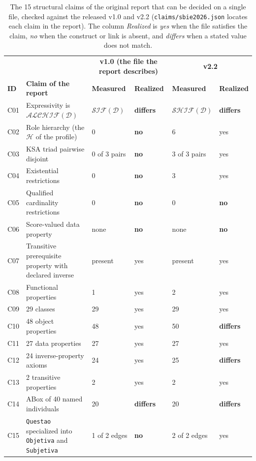 \begin{table}[!t]
\caption{The 15 structural claims of the original report \cite{nogueira_sbie} that can be decided on a single file, checked against the released v1.0 and v2.2 (\texttt{claims/sbie2026.json} locates each claim in the report). The column \emph{Realized} is \emph{yes} when the file satisfies the claim, \emph{no} when the construct or link is absent, and \emph{differs} when a stated value does not match.}
\label{tab:claims}
\centering
\footnotesize
\begin{tabular}{llllll}
\hline
& & \multicolumn{2}{c}{\textbf{v1.0 (the file the report describes)}} & \multicolumn{2}{c}{\textbf{v2.2}} \\
\textbf{ID} & \textbf{Claim of the report} & \textbf{Measured} & \textbf{Realized} & \textbf{Measured} & \textbf{Realized} \\
\hline
C01 & Expressivity is \ensuremath{\mathcal{ALCHIF}(\mathcal{D})} & \ensuremath{\mathcal{SIF}(\mathcal{D})} & \textbf{differs} & \ensuremath{\mathcal{SHIF}(\mathcal{D})} & \textbf{differs} \\
C02 & Role hierarchy (the $\mathcal{H}$ of the profile) & 0 & \textbf{no} & 6 & yes \\
C03 & KSA triad pairwise disjoint & 0 of 3 pairs & \textbf{no} & 3 of 3 pairs & yes \\
C04 & Existential restrictions & 0 & \textbf{no} & 3 & yes \\
C05 & Qualified cardinality restrictions & 0 & \textbf{no} & 0 & \textbf{no} \\
C06 & Score-valued data property & none & \textbf{no} & none & \textbf{no} \\
C07 & Transitive prerequisite property with declared inverse & present & yes & present & yes \\
C08 & Functional properties & 1 & yes & 2 & yes \\
C09 & 29 classes & 29 & yes & 29 & yes \\
C10 & 48 object properties & 48 & yes & 50 & \textbf{differs} \\
C11 & 27 data properties & 27 & yes & 27 & yes \\
C12 & 24 inverse-property axioms & 24 & yes & 25 & \textbf{differs} \\
C13 & 2 transitive properties & 2 & yes & 2 & yes \\
C14 & ABox of 40 named individuals & 20 & \textbf{differs} & 20 & \textbf{differs} \\
C15 & \texttt{Questao} specialized into \texttt{Objetiva} and \texttt{Subjetiva} & 1 of 2 edges & \textbf{no} & 2 of 2 edges & yes \\
\hline
\end{tabular}
\end{table}
